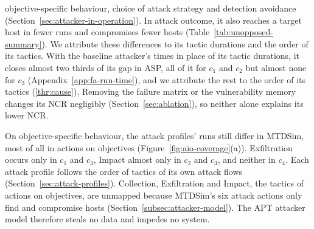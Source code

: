 \documentclass{cshonours}
\begin{document}
objective-specific behaviour, choice of attack strategy and detection
avoidance (Section~\ref{sec:attacker-in-operation}). In attack outcome, it
also reaches a target host in fewer runs and compromises fewer hosts
(Table~\ref{tab:unopposed-summary}). We attribute these differences to its
tactic durations and the order of its tactics. With the baseline attacker's times in
place of its tactic durations, it closes almost two thirds of its gap in ASP,
all of it for $c_1$ and $c_2$ but almost none for $c_3$
(Appendix~\ref{app:fa-run-time}), and we attribute the rest to the order of its
tactics (\ref{thr:cause}). Removing the
failure matrix or the vulnerability memory changes its NCR negligibly
(Section~\ref{sec:ablation}), so neither alone explains its lower NCR.

On objective-specific behaviour, the attack profiles' runs still differ in
MTDSim, most of all in actions on objectives (Figure~\ref{fig:aio-coverage}(a)).
Exfiltration occurs only in $c_1$ and $c_3$, Impact almost only in $c_2$ and
$c_3$, and neither in $c_4$. Each attack profile follows the order of tactics
of its own attack flows (Section~\ref{sec:attack-profiles}). Collection, Exfiltration and Impact, the
tactics of actions on objectives, are unmapped because MTDSim's six attack
actions only find and compromise hosts (Section~\ref{subsec:attacker-model}).
The APT attacker model therefore steals no data and impedes no system.
\end{document}
